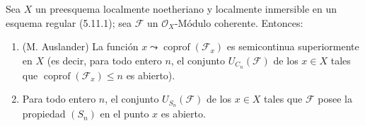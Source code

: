 \begin{proposition}[6.11.2]
\label{IV.2.s6.11.2-fr}
Sea $X$ un preesquema localmente noetheriano y localmente inmersible en
un esquema regular \textup{(5.11.1)}; sea $\mathcal F$ un $\mathcal O_X$-Módulo
coherente. Entonces:
\begin{enumerate}
\item[\textup{(i)}] \textup{(M. Auslander)} La función
$x\leadsto\operatorname{coprof}(\mathcal F_x)$ es semicontinua
superiormente en $X$ \textup{(es decir, para todo entero $n$, el conjunto
$U_{C_n}(\mathcal F)$ de los $x\in X$ tales que
$\operatorname{coprof}(\mathcal F_x)\leq n$ es} abierto).
\item[\textup{(ii)}] Para todo entero $n$, el conjunto $U_{S_n}(\mathcal F)$ de los
$x\in X$ tales que $\mathcal F$ posee la propiedad $(S_n)$ en el punto $x$
es abierto.
\end{enumerate}
\end{proposition}

